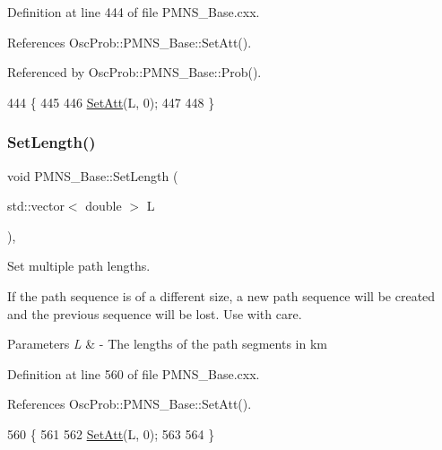 Definition at line 444 of file P\+M\+N\+S\+\_\+\+Base.\+cxx.



References Osc\+Prob\+::\+P\+M\+N\+S\+\_\+\+Base\+::\+Set\+Att().



Referenced by Osc\+Prob\+::\+P\+M\+N\+S\+\_\+\+Base\+::\+Prob().


\begin{DoxyCode}
444                                  \{
445 
446   \hyperlink{classOscProb_1_1PMNS__Base_aba565962a440d14bee7a2a96d2eca2c5}{SetAtt}(L, 0);
447 
448 \}
\end{DoxyCode}
\mbox{\label{classOscProb_1_1PMNS__Base_aa34a40a3b5abda0f252982d9ead3b520}} 
\subsubsection{\texorpdfstring{Set\+Length()}{SetLength()}\hspace{0.1cm}{\footnotesize\ttfamily [2/2]}}
{\footnotesize\ttfamily void P\+M\+N\+S\+\_\+\+Base\+::\+Set\+Length (\begin{DoxyParamCaption}\item[{std\+::vector$<$ double $>$}]{L }\end{DoxyParamCaption})\hspace{0.3cm}{\ttfamily [virtual]}, {\ttfamily [inherited]}}

Set multiple path lengths.

If the path sequence is of a different size, a new path sequence will be created and the previous sequence will be lost. Use with care.


\begin{DoxyParams}{Parameters}
{\em L} & -\/ The lengths of the path segments in km \\
\hline
\end{DoxyParams}


Definition at line 560 of file P\+M\+N\+S\+\_\+\+Base.\+cxx.



References Osc\+Prob\+::\+P\+M\+N\+S\+\_\+\+Base\+::\+Set\+Att().


\begin{DoxyCode}
560                                             \{
561 
562   \hyperlink{classOscProb_1_1PMNS__Base_aba565962a440d14bee7a2a96d2eca2c5}{SetAtt}(L, 0);
563 
564 \}
\end{DoxyCode}
\mbox{\label{classOscProb_1_1PMNS__Base_ae67862cf58b0802487a14b047b012a78}} 
